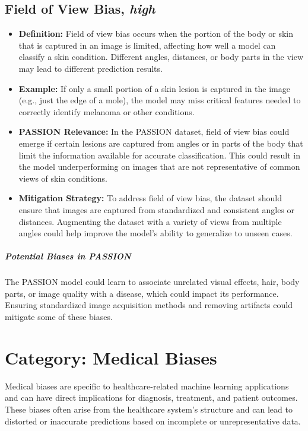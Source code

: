 \begin{refsection}
		\subsection{Field of View Bias, \textit{high}}
		\begin{itemize}
			\item \textbf{Definition:} Field of view bias occurs when the portion of the body or skin that is captured in an image is limited, affecting how well a model can classify a skin condition. Different angles, distances, or body parts in the view may lead to different prediction results.
			\item \textbf{Example:} If only a small portion of a skin lesion is captured in the image (e.g., just the edge of a mole), the model may miss critical features needed to correctly identify melanoma or other conditions.
			\item \textbf{PASSION Relevance:} In the PASSION dataset, field of view bias could emerge if certain lesions are captured from angles or in parts of the body that limit the information available for accurate classification. This could result in the model underperforming on images that are not representative of common views of skin conditions.
			\item \textbf{Mitigation Strategy:} To address field of view bias, the dataset should ensure that images are captured from standardized and consistent angles or distances. Augmenting the dataset with a variety of views from multiple angles could help improve the model's ability to generalize to unseen cases.
		\end{itemize}
		
		\subparagraph{Potential Biases in PASSION}
		The PASSION model could learn to associate unrelated visual effects, hair, body parts, or image quality with a disease, which could impact its performance. Ensuring standardized image acquisition methods and removing artifacts could mitigate some of these biases.
		
		\section{\textbf{Category:} Medical Biases}
		Medical biases are specific to healthcare-related machine learning applications and can have direct implications for diagnosis, treatment, and patient outcomes. These biases often arise from the healthcare system’s structure and can lead to distorted or inaccurate predictions based on incomplete or unrepresentative data.
		

\end{refsection}
